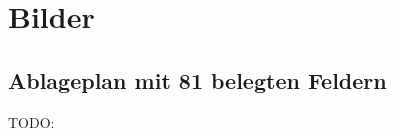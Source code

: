 \chapter{Bilder}
\label{anhang:chapter-bilder}

\section{Ablageplan mit 81 belegten Feldern}
\label{anhang:section-ablageplan-81}

TODO:

\pagebreak